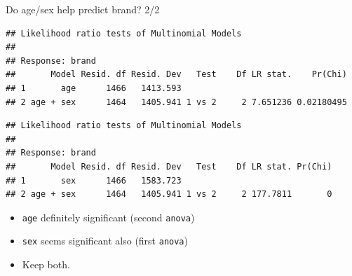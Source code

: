 \begin{frame}[fragile]{Do age/sex help predict brand? 2/2}

{\footnotesize  
 
\begin{knitrout}
\color{fgcolor}\begin{kframe}
\begin{alltt}
\end{alltt}
\begin{verbatim}
## Likelihood ratio tests of Multinomial Models
## 
## Response: brand
##       Model Resid. df Resid. Dev   Test    Df LR stat.    Pr(Chi)
## 1       age      1466   1413.593                                 
## 2 age + sex      1464   1405.941 1 vs 2     2 7.651236 0.02180495
\end{verbatim}
\begin{alltt}
\end{alltt}
\begin{verbatim}
## Likelihood ratio tests of Multinomial Models
## 
## Response: brand
##       Model Resid. df Resid. Dev   Test    Df LR stat. Pr(Chi)
## 1       sex      1466   1583.723                              
## 2 age + sex      1464   1405.941 1 vs 2     2 177.7811       0
\end{verbatim}
\end{kframe}
\end{knitrout}
  }
  
\begin{itemize}
\item \texttt{age} definitely significant (second \texttt{anova})
\item \texttt{sex} seems significant also (first \texttt{anova})
\item Keep both.
\end{itemize}
  
  
\end{frame}

